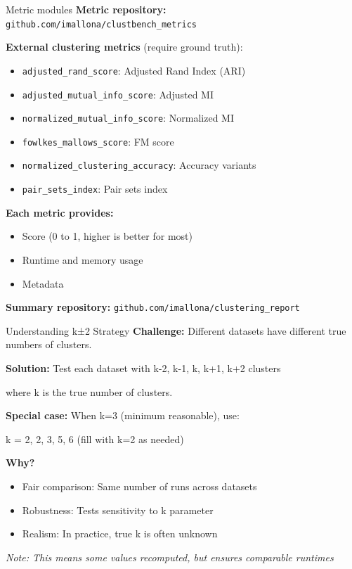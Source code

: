 \documentclass[aspectratio=169]{beamer}
\begin{document}
\begin{frame}{Metric modules}
    \textbf{Metric repository:} \texttt{github.com/imallona/clustbench\_metrics}
    
    \vspace{0.3cm}
    \textbf{External clustering metrics} (require ground truth):
    \begin{itemize}
        \item \texttt{adjusted\_rand\_score}: Adjusted Rand Index (ARI)
        \item \texttt{adjusted\_mutual\_info\_score}: Adjusted MI
        \item \texttt{normalized\_mutual\_info\_score}: Normalized MI
        \item \texttt{fowlkes\_mallows\_score}: FM score
        \item \texttt{normalized\_clustering\_accuracy}: Accuracy variants
        \item \texttt{pair\_sets\_index}: Pair sets index
    \end{itemize}
    
    \vspace{0.3cm}
    \textbf{Each metric provides:}
    \begin{itemize}
        \item Score (0 to 1, higher is better for most)
        \item Runtime and memory usage
        \item Metadata
    \end{itemize}
    
    \vspace{0.3cm}
    \textbf{Summary repository:} \texttt{github.com/imallona/clustering\_report}
\end{frame}

\begin{frame}{Understanding k±2 Strategy}
    \textbf{Challenge:} Different datasets have different true numbers of clusters.
    
    \vspace{0.3cm}
    \textbf{Solution:} Test each dataset with k-2, k-1, k, k+1, k+2 clusters
    
    where k is the true number of clusters.
    
    \vspace{0.3cm}
    \textbf{Special case:} When k=3 (minimum reasonable), use:
    
    k = 2, 2, 3, 5, 6 (fill with k=2 as needed)
    
    \vspace{0.3cm}
    \textbf{Why?}
    \begin{itemize}
        \item Fair comparison: Same number of runs across datasets
        \item Robustness: Tests sensitivity to k parameter
        \item Realism: In practice, true k is often unknown
    \end{itemize}
    
    \vspace{0.3cm}
    \textit{Note: This means some values recomputed, but ensures comparable runtimes}
\end{frame}
\end{document}

